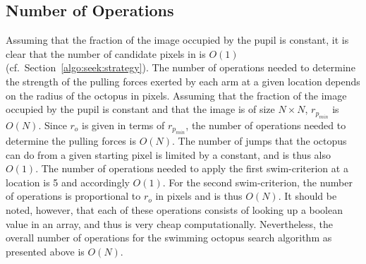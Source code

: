 
\subsection{Number of Operations}
\label{algo:seek:O}

Assuming that the fraction of the image occupied by the pupil is
constant, it is clear that the number of candidate pixels in {\SS} is
$O(1)$ (cf.\ Section~\ref{algo:seek:strategy}).  The number of
operations needed to determine the strength of the pulling forces
exerted by each arm at a given location depends on the radius of the
octopus in pixels.  Assuming that the fraction of the image occupied
by the pupil is constant and that the image is of size $N\times N$,
$r_{p_{min}}$ is $O(N)$.  Since $r_{o}$ is given in terms of
$r_{p_{min}}$, the number of operations needed to determine the
pulling forces is $O(N)$.  The number of jumps that the octopus can do
from a given starting pixel is limited by a constant, and is thus also
$O(1)$.  The number of operations needed to apply the first
swim-criterion at a location is 5 and accordingly $O(1)$.  For the
second swim-criterion, the number of operations is proportional to
$r_{o}$ in pixels and is thus $O(N)$.  It should be noted, however,
that each of these operations consists of looking up a boolean value
in an array, and thus is very cheap computationally.  Nevertheless,
the overall number of operations for the swimming octopus search
algorithm as presented above is $O(N)$.
